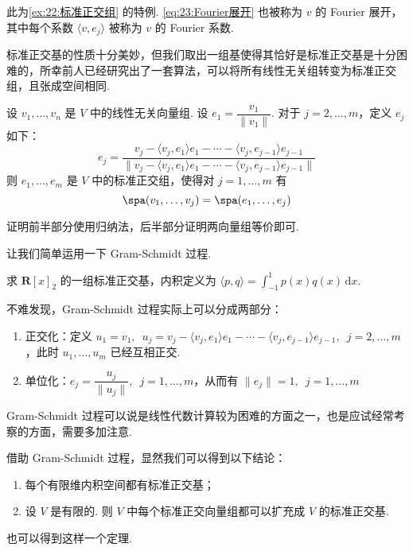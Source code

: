 此为\autoref{ex:22:标准正交组} 的特例. \autoref{eq:23:Fourier展开} 也被称为 $ v $ 的 Fourier 展开，其中每个系数 $ \langle v, e_j \rangle $ 被称为 $ v $ 的 Fourier 系数.

标准正交基的性质十分美妙，但我们取出一组基使得其恰好是标准正交基是十分困难的，所幸前人已经研究出了一套算法，可以将所有线性无关组转变为标准正交组，且张成空间相同.

\begin{theorem} 
    设 $v_1, \ldots ,v_n$ 是 $ V $ 中的线性无关向量组. 设 $e_1 = \dfrac{v_1}{\lVert v_1 \rVert}$. 对于 $ j = 2, \ldots , m$，定义 $ e_j $ 如下：
    \[ e_j = \frac{v_j - \langle v_j, e_1 \rangle e_1 - \cdots - \langle v_j, e_{j - 1} \rangle e_{j - 1} }{\lVert v_j - \langle v_j, e_1 \rangle e_1 - \cdots - \langle v_j, e_{j - 1} \rangle e_{j - 1} \rVert}\]
    则 $e_1, \ldots , e_m $ 是 $ V $ 中的标准正交组，使得对 $ j = 1, \ldots , m $ 有
    \[ \spa(v_1, \ldots, v_j) = \spa(e_1, \ldots, e_j) \]
\end{theorem}

证明前半部分使用归纳法，后半部分证明两向量组等价即可.

让我们简单运用一下 Gram-Schmidt 过程.
\begin{example}
    求 $\mathbf{R}[x]_2$ 的一组标准正交基，内积定义为 $\langle p, q \rangle = \displaystyle\int_{-1}^1 p(x)q(x)\,\mathrm{d}x$.
\end{example}

不难发现，Gram-Schmidt 过程实际上可以分成两部分：
\begin{enumerate}
    \item 正交化：定义 $ u_1 = v_1 , \enspace u_j = v_j - \langle v_j, e_1 \rangle e_1 - \cdots - \langle v_j, e_{j - 1} \rangle e_{j - 1}, \enspace j = 2, \ldots , m$，此时 $u_1, \ldots , u_m$ 已经互相正交.

    \item 单位化：$ e_j = \dfrac{u_j}{\lVert u_j \rVert} , \enspace j = 1, \ldots , m$，从而有 $\lVert e_j \rVert = 1, \enspace j = 1, \ldots , m$
\end{enumerate}

Gram-Schmidt 过程可以说是线性代数计算较为困难的方面之一，也是应试经常考察的方面，需要多加注意.

借助 Gram-Schmidt 过程，显然我们可以得到以下结论：
\begin{enumerate}
    \item 每个有限维内积空间都有标准正交基；

    \item 设 $ V $ 是有限的. 则 $ V $ 中每个标准正交向量组都可以扩充成 $ V $ 的标准正交基.
\end{enumerate}
也可以得到这样一个定理.

